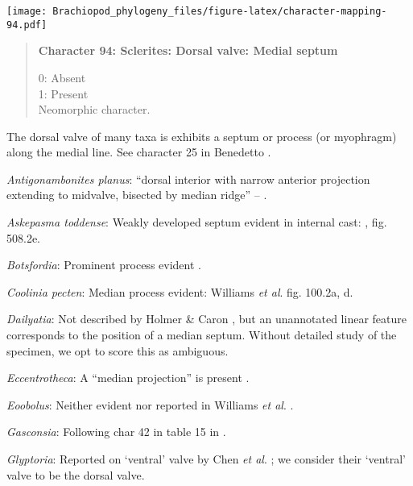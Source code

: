 \documentclass[openany]{book}
\theoremstyle{definition}
\theoremstyle{definition}
\theoremstyle{definition}
\theoremstyle{remark}
\begin{document}
\texttt{[image: Brachiopod\_phylogeny\_files/figure-latex/character-mapping-94.pdf]}

\begin{quote}
\textbf{Character 94: Sclerites: Dorsal valve: Medial septum}

0: Absent\\
1: Present\\
Neomorphic character.
\end{quote}

The dorsal valve of many taxa is exhibits a septum or process (or
myophragm) along the medial line. See character 25 in Benedetto
\citeyearpar{Benedetto2009iChaniella}.

\hypertarget{Antigonambonites_planus-coding-94}{}
\emph{Antigonambonites planus}: ``dorsal interior with narrow anterior
projection extending to midvalve, bisected by median ridge'' --
\citet{Williams2000LinguliformeaCraniiformea}.

\hypertarget{Askepasma_toddense-coding-94}{}
\emph{Askepasma toddense}: Weakly developed septum evident in internal
cast: \citet{Williams2000LinguliformeaCraniiformea}, fig. 508.2e.

\hypertarget{Botsfordia-coding-94}{}
\emph{Botsfordia}: Prominent process evident
\citep{Topper2013Reappraisalof}.

\hypertarget{Coolinia_pecten-coding-94}{}
\emph{Coolinia pecten}: Median process evident: Williams \emph{et al}.
\citeyearpar{Williams2000LinguliformeaCraniiformea} fig. 100.2a, d.

\hypertarget{Dailyatia-coding-94}{}
\emph{Dailyatia}: Not described by Holmer \& Caron
\citeyearpar{Holmer2006Aspinose}, but an unannotated linear feature
corresponds to the position of a median septum. Without detailed study
of the specimen, we opt to score this as ambiguous.

\hypertarget{Eccentrotheca-coding-94}{}
\emph{Eccentrotheca}: A ``median projection'' is present \citep[fig. 4g
in][]{Balthasar2009Thebrachiopod}.

\hypertarget{Eoobolus-coding-94}{}
\emph{Eoobolus}: Neither evident nor reported in Williams \emph{et al}.
\citeyearpar{Williams2000LinguliformeaCraniiformea}.

\hypertarget{Gasconsia-coding-94}{}
\emph{Gasconsia}: Following char 42 in table 15 in
\citet{Williams2000LinguliformeaCraniiformea}.

\hypertarget{Glyptoria-coding-94}{}
\emph{Glyptoria}: Reported on `ventral' valve by Chen \emph{et al}.
\citeyearpar{Chen2007Reinterpretationof}; we consider their `ventral'
valve to be the dorsal valve.
\end{document}
